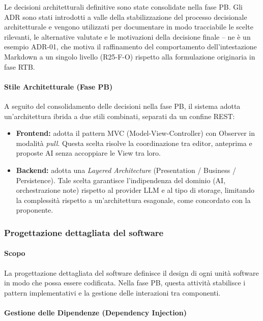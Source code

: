 Le decisioni architetturali definitive sono state consolidate nella fase PB. Gli
ADR sono stati introdotti a valle della stabilizzazione del processo decisionale
architetturale e vengono utilizzati per documentare in modo tracciabile le scelte
rilevanti, le alternative valutate e le motivazioni della decisione finale --
ne è un esempio ADR-01, che motiva il raffinamento del comportamento
dell'intestazione Markdown a un singolo livello (R25-F-O) rispetto alla
formulazione originaria in fase RTB.

\paragraph{Stile Architetturale (Fase PB)}
A seguito del consolidamento delle decisioni nella fase PB, il sistema adotta un'architettura ibrida a due stili combinati, separati da un confine REST:
\begin{itemize}
    \item \textbf{Frontend:} adotta il pattern MVC (Model-View-Controller) con Observer in modalità \textit{pull}. Questa scelta risolve la coordinazione tra editor, anteprima e proposte AI senza accoppiare le View tra loro.
    \item \textbf{Backend:} adotta una \textit{Layered Architecture} (Presentation / Business / Persistence). Tale scelta garantisce l'indipendenza del dominio (AI, orchestrazione note) rispetto al provider LLM e al tipo di storage, limitando la complessità rispetto a un'architettura esagonale, come concordato con la proponente.
\end{itemize}


\subsubsection{Progettazione dettagliata del software}

\paragraph{Scopo}

La progettazione dettagliata del software definisce il design di ogni unità software in modo che possa essere codificata. Nella fase PB, questa attività stabilisce i pattern implementativi e la gestione delle interazioni tra componenti.

\paragraph{Gestione delle Dipendenze (Dependency Injection)}

